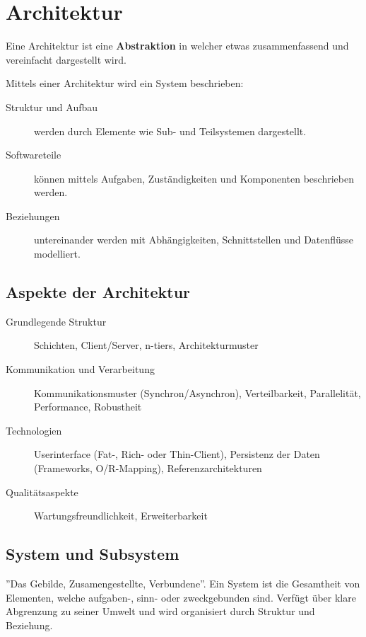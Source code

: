\section{Architektur}
Eine Architektur ist eine \textbf{Abstraktion} in welcher etwas zusammenfassend und vereinfacht dargestellt wird.

Mittels einer Architektur wird ein System beschrieben:

\begin{description}
	\item[Struktur und Aufbau] werden durch Elemente wie Sub- und Teilsystemen dargestellt.
	\item[Softwareteile] können mittels Aufgaben, Zuständigkeiten und Komponenten beschrieben werden.
	\item [Beziehungen] untereinander werden mit Abhängigkeiten, Schnittstellen und Datenflüsse modelliert.
\end{description}

\subsection{Aspekte der Architektur}
\begin{description}
	\item[Grundlegende Struktur] Schichten, Client/Server, n-tiers, Architekturmuster
	\item[Kommunikation und Verarbeitung] Kommunikationsmuster (Synchron/Asynchron), Verteilbarkeit, Parallelität, Performance, Robustheit
	\item[Technologien] Userinterface (Fat-, Rich- oder Thin-Client), Persistenz der Daten (Frameworks, O/R-Mapping), Referenzarchitekturen
	\item[Qualitätsaspekte] Wartungsfreundlichkeit, Erweiterbarkeit
\end{description}

\subsection{System und Subsystem}
''Das Gebilde, Zusamengestellte, Verbundene''. Ein System ist die Gesamtheit von Elementen, welche aufgaben-, sinn- oder zweckgebunden sind. Verfügt über klare Abgrenzung zu seiner Umwelt und wird organisiert durch Struktur und Beziehung.

